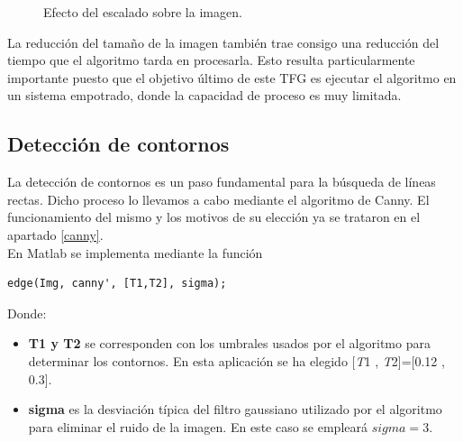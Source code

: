 \begin{figure}[!h]
\centering {}
\caption{\small{Efecto del escalado sobre la imagen.}} \label{figescalado}
\end{figure}

La reducción del tamaño de la imagen también trae consigo una reducción del tiempo que el algoritmo tarda en procesarla. Esto resulta particularmente importante puesto que el objetivo último de este \ac{TFG} es ejecutar el algoritmo en un sistema empotrado, donde la capacidad de proceso es muy limitada.

\subsection{Detección de contornos}\label{Canny}
La detección de contornos es un paso fundamental para la búsqueda de líneas rectas. Dicho proceso lo llevamos a cabo mediante el algoritmo de Canny. El funcionamiento del mismo y los motivos de su elección ya se trataron en el apartado \ref{canny}.\\

En Matlab se implementa mediante la función

\begin{lstlisting}
edge(Img, canny', [T1,T2], sigma);
\end{lstlisting}

\newpage 
Donde:
\begin{itemize}
\item \textbf{T1 y T2} se corresponden con los umbrales usados por el algoritmo para determinar los contornos. En esta aplicación se ha elegido [\emph{T}1 , \emph{T}2]=[0.12 ,  0.3].

\item \textbf{sigma} es la desviación típica del filtro gaussiano utilizado por el algoritmo para eliminar el ruido de la imagen. En este caso se empleará $sigma=3$.
\end{itemize}

